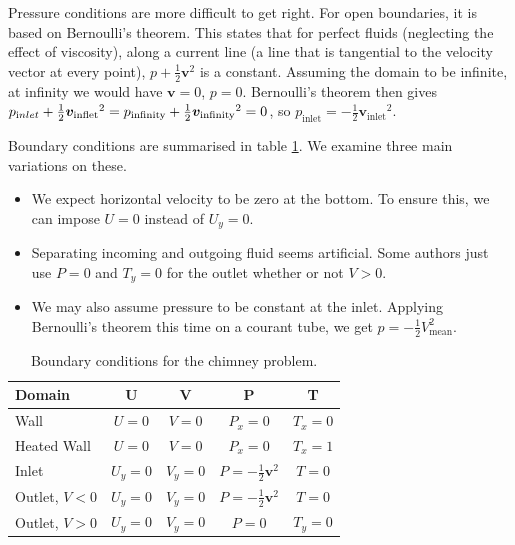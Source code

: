 \documentclass[12pt]{article}
\newcommand{\vb}[1]{\ensuremath{\boldsymbol #1}}
\begin{document}
Pressure conditions are more difficult to get right. For open
boundaries, it is based on Bernoulli's theorem. This states that for
perfect fluids (neglecting the effect of viscosity), along a current
line (a line that is tangential to the velocity vector at every
point), $p + \frac{1}{2} \vb{v}^{2}$ is a constant. Assuming the
domain to be infinite, at infinity we would have $\vb{v} = 0$, $p =
0$. Bernoulli's theorem then gives $p_{\text inlet} + \frac 1 2 {\vb
  {v_{\text{inflet}}}}^{2} = p_{\text {infinity}} + \frac 1 2 {\vb
  {v_{\text{infinity}}}}^{2} = 0$, so $p_{\text{inlet}} = - \frac 1 2
{\vb v_{\text{inlet}}}^{2}$.

Boundary conditions are summarised in table \ref{table:bc}. We examine
three main variations on these.

\begin{itemize}
  \item We expect horizontal velocity to be zero at the bottom. To
    ensure this, we can impose $U = 0$ instead of $U_{y} = 0$.
  \item Separating incoming and outgoing fluid seems artificial. Some
    authors just use $P = 0$ and $T_{y} = 0$ for the outlet whether or
    not $V > 0$.
  \item We may also assume pressure to be constant at the
    inlet. Applying Bernoulli's theorem this time on a courant tube,
    we get $p = - \frac 1 2 V_{\text{mean}}^{2}$.
\end{itemize}


\begin{table}[!h]
  \centering
  \begin{tabular}{|l|c|c|c|c|}
    \hline
    Domain & U & V & P & T \\
    \hline
    Wall         & $U = 0$     & $V = 0$     & $P_{x} = 0$             & $T_{x} = 0$ \\
    Heated Wall  & $U = 0$     & $V = 0$     & $P_{x} = 0$             & $T_{x} = 1$ \\
    Inlet           & $U_{y} = 0$ & $V_{y} = 0$ & $P = -\frac 1 2 {\vb{v}^{2}}$  & $T = 0$     \\
    Outlet, $V < 0$ & $U_{y} = 0$ & $V_{y} = 0$ & $P = -\frac 1 2 {\vb{v}^{2}} $ & $T = 0$     \\
    Outlet, $V > 0$ & $U_{y} = 0$ & $V_{y} = 0$ & $P = 0$                 & $T_y = 0$   \\
    \hline
  \end{tabular}
  \caption{Boundary conditions for the chimney problem.}
  \label{table:bc}
\end{table}
\end{document}

